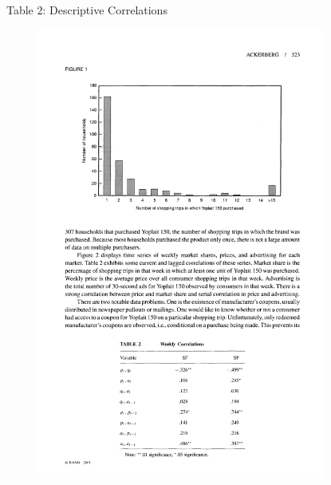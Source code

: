 \documentclass[xcolor=pdftex,dvipsnames,table,mathserif]{beamer}
\begin{document}
\begin{frame}{Table 2: Descriptive Correlations}
\begin{figure}[htbp]
\begin{center}
\includegraphics[width=9.5cm]{resources/acker2.pdf}
\label{default}
\end{center}
\end{figure}
\end{frame}
\end{document}
